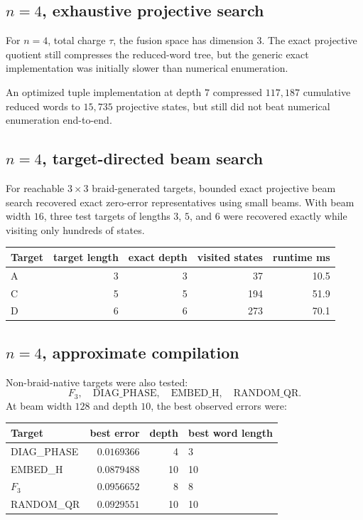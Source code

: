 \documentclass[11pt]{article}
\begin{document}
\subsection{$n=4$, exhaustive projective search}

For $n=4$, total charge $\tau$, the fusion space has dimension $3$.  The exact projective quotient still compresses the reduced-word tree, but the generic exact implementation was initially slower than numerical enumeration.

An optimized tuple implementation at depth $7$ compressed $117{,}187$ cumulative reduced words to $15{,}735$ projective states, but still did not beat numerical enumeration end-to-end.

\subsection{$n=4$, target-directed beam search}

For reachable $3\times 3$ braid-generated targets, bounded exact projective beam search recovered exact zero-error representatives using small beams.  With beam width $16$, three test targets of lengths $3$, $5$, and $6$ were recovered exactly while visiting only hundreds of states.

\begin{center}
\begin{tabular}{lrrrr}
\toprule
Target & target length & exact depth & visited states & runtime ms \\
\midrule
A & 3 & 3 & 37 & 10.5 \\
C & 5 & 5 & 194 & 51.9 \\
D & 6 & 6 & 273 & 70.1 \\
\bottomrule
\end{tabular}
\end{center}

\subsection{$n=4$, approximate compilation}

Non-braid-native targets were also tested:
\[
    F_3,\quad
    \text{DIAG\_PHASE},\quad
    \text{EMBED\_H},\quad
    \text{RANDOM\_QR}.
\]
At beam width $128$ and depth $10$, the best observed errors were:

\begin{center}
\begin{tabular}{lrrl}
\toprule
Target & best error & depth & best word length \\
\midrule
DIAG\_PHASE & $0.0169366$ & 4 & 3 \\
EMBED\_H & $0.0879488$ & 10 & 10 \\
$F_3$ & $0.0956652$ & 8 & 8 \\
RANDOM\_QR & $0.0929551$ & 10 & 10 \\
\bottomrule
\end{tabular}
\end{center}
\end{document}
